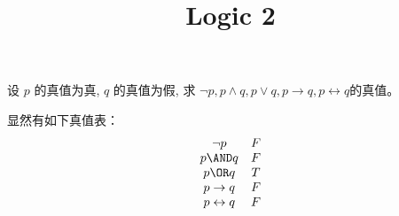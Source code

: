 \documentclass{ctexart}
\newif\ifpreface
\begin{document}
\large
\setlength{\baselineskip}{1.2em}
\ifpreface
  
\else
  \title{Logic 2}
  \maketitle
\fi
\begin{problem}\label{pro:1}
  设 $p$ 的真值为真, $q$ 的真值为假, 求 $\neg p , p \wedge q , p \vee q , p \rightarrow q , p \leftrightarrow q$的真值。
\end{problem}
\begin{solution}
  显然有如下真值表：
  \[
    \begin{matrix}
      \neg p               & F \\
      p \AND q             & F \\
      p \OR q              & T \\
      p \to q              & F \\
      p \leftrightarrow  q & F \\
    \end{matrix}
  \]
\end{solution}
\end{document}
